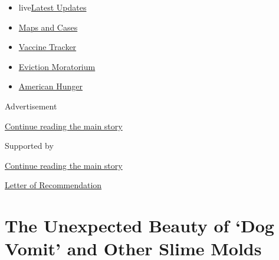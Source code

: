 \begin{itemize}
\tightlist
\item
  live\href{https://www.nytimes3xbfgragh.onion/2020/09/08/world/covid-19-coronavirus.html?name=styln-coronavirus-national\&region=TOP_BANNER\&block=storyline_menu_recirc\&action=click\&pgtype=Article\&impression_id=1d0d90d1-f1be-11ea-b289-89f7aaa81ae4\&variant=undefined}{Latest
  Updates}
\item
  \href{https://www.nytimes3xbfgragh.onion/interactive/2020/us/coronavirus-us-cases.html?name=styln-coronavirus-national\&region=TOP_BANNER\&block=storyline_menu_recirc\&action=click\&pgtype=Article\&impression_id=1d0d90d2-f1be-11ea-b289-89f7aaa81ae4\&variant=undefined}{Maps
  and Cases}
\item
  \href{https://www.nytimes3xbfgragh.onion/interactive/2020/science/coronavirus-vaccine-tracker.html?name=styln-coronavirus-national\&region=TOP_BANNER\&block=storyline_menu_recirc\&action=click\&pgtype=Article\&impression_id=1d0db7e0-f1be-11ea-b289-89f7aaa81ae4\&variant=undefined}{Vaccine
  Tracker}
\item
  \href{https://www.nytimes3xbfgragh.onion/2020/09/02/your-money/eviction-moratorium-covid.html?name=styln-coronavirus-national\&region=TOP_BANNER\&block=storyline_menu_recirc\&action=click\&pgtype=Article\&impression_id=1d0db7e1-f1be-11ea-b289-89f7aaa81ae4\&variant=undefined}{Eviction
  Moratorium}
\item
  \href{https://www.nytimes3xbfgragh.onion/interactive/2020/09/02/magazine/food-insecurity-hunger-us.html?name=styln-coronavirus-national\&region=TOP_BANNER\&block=storyline_menu_recirc\&action=click\&pgtype=Article\&impression_id=1d0db7e2-f1be-11ea-b289-89f7aaa81ae4\&variant=undefined}{American
  Hunger}
\end{itemize}

Advertisement

\protect\hyperlink{after-top}{Continue reading the main story}

Supported by

\protect\hyperlink{after-sponsor}{Continue reading the main story}

\href{/column/letter-of-recommendation}{Letter of Recommendation}

\hypertarget{the-unexpected-beauty-of-dog-vomit-and-other-slime-molds}{%
\section{The Unexpected Beauty of `Dog Vomit' and Other Slime
Molds}\label{the-unexpected-beauty-of-dog-vomit-and-other-slime-molds}}

